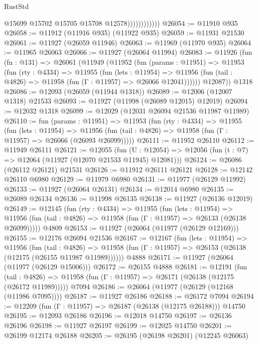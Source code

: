 \begin{lexlean}{RustStd}
\begin{coremodule}
                            @15699
                            @15702
                            @15705
                            @15708
                            @12578))))))))))))
@26054 := @11910 @935
@26058 := @11912 (@11916 @935) (@11922 @935)
@26059 := @11931 @21530
@26061 := @11927 (@26059 @11946)
@26063 := @11969 (@11970 @935)
@26064 := @11965 @26063
@26066 := @11927 (@26064 @11994)
@26083 := @11926
    (fun (fn : @131) =>
    @26061
      (@11949
        (@11952
          (fun (params : @11951) =>
          @11953
            (fun (rty : @4334) =>
            @11955
              (fun (lets : @11954) =>
              @11956 (fun (tail : @4826) => @11958 (fun (Γ : @11957) => @26066 @12041))))))
        @12087))
    @1318
@26086 := @12093 (@26059 (@11944 @1318))
@26089 := @12006 (@12007 @1318) @21533
@26093 := @11927 (@11998 (@26089 @12015) @12019)
@26094 := @12032 @1318
@26099 := @12029 (@12031 @26094 @21536 @11987 @11989)
@26110 := fun (params : @11951) =>
  @11953
    (fun (rty : @4334) =>
    @11955
      (fun (lets : @11954) =>
      @11956 (fun (tail : @4826) => @11958 (fun (Γ : @11957) => @26066 (@26093 @26099)))))
@26111 := @11952 @26110
@26112 := @11949 @26111
@26121 := @12055
    (fun (U : @12054) => @12056 (fun (t : @7) => @12064 (@11927 (@12070 @21533 @11945) @12081)))
@26124 := @26086 (@26112 @26121) @21531
@26126 := @11912 @26111 @26121
@26128 := @12142 @26110 @6980
@26129 := @11979 @6980
@26131 := @11977 (@26129 @11992)
@26133 := @11927 (@26064 @26131)
@26134 := @12014 @6980
@26135 := @26089 @26134
@26136 := @11998 @26135
@26138 := @11927 (@26136 @12019)
@26149 := @12145
    (fun (rty : @4334) =>
    @11955
      (fun (lets : @11954) =>
      @11956 (fun (tail : @4826) => @11958 (fun (Γ : @11957) => @26133 (@26138 @26099)))))
    @4809
@26153 := @11927 (@26064 (@11977 (@26129 @12169)))
@26155 := @12176 @26094 @21536
@26167 := @12167
    (fun (lets : @11954) =>
    @11956
      (fun (tail : @4826) =>
      @11958 (fun (Γ : @11957) => @26153 (@26138 (@12175 (@26155 @11987 @11989))))))
    @4888
@26171 := @11927 (@26064 (@11977 (@26129 @15006)))
@26172 := @26155 @4888
@26181 := @12191
    (fun (tail : @4826) => @11958 (fun (Γ : @11957) => @26171 (@26138 (@12175 (@26172 @11989)))))
    @7094
@26186 := @26064 (@11977 (@26129 (@12168 (@11986 @7095))))
@26187 := @11927 @26186
@26188 := @26172 @7094
@26194 := @12209 (fun (Γ : @11957) => @26187 (@26138 (@12175 @26188))) @14750
@26195 := @12093 @26186
@26196 := @12018 @14750
@26197 := @26136 @26196
@26198 := @11927 @26197
@26199 := @12025 @14750
@26201 := @26199 @12174 @26188
@26205 := @26195 (@26198 @26201) (@12245 @26063)

\end{coremodule}
\end{lexlean}
